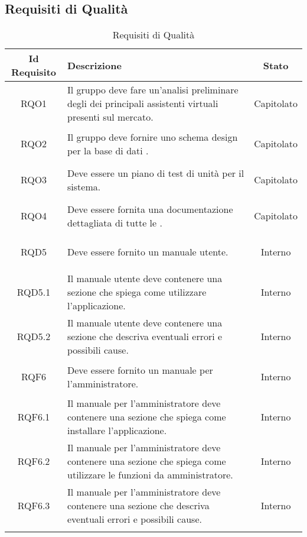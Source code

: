 \subsection{Requisiti di Qualità}
\normalsize
\begin{longtable}{|c|>{\centering}m{7cm}|c|}
	\hline
	\textbf{Id Requisito} & \textbf{Descrizione} & \textbf{Stato}\\
	\hline
	\endhead\hypertarget{RQO1}{RQO1} & Il gruppo deve fare un'analisi preliminare degli \gl{SDK} dei principali assistenti virtuali presenti sul mercato. & Capitolato\\ \hline
	\hypertarget{RQO2}{RQO2} & Il gruppo deve fornire uno schema design per la base di dati \gl{NoSQL}.
	& Capitolato\\ \hline
	\hypertarget{RQO3}{RQO3} & Deve essere \gl{prodotto} un piano di test di unità per il sistema. & Capitolato\\ \hline
	\hypertarget{RQO4}{RQO4} & Deve essere fornita una documentazione dettagliata di tutte le \gl{API}. & Capitolato\\ \hline
	\hypertarget{RQD5}{RQD5} & Deve essere fornito un manuale utente. & Interno\\ \hline
	\hypertarget{RQD5.1}{RQD5.1} & Il manuale utente deve contenere una sezione che spiega come utilizzare l'applicazione. & Interno\\ \hline
	\hypertarget{RQD5.2}{RQD5.2} & Il manuale utente deve contenere una sezione che descriva eventuali errori e possibili cause. & Interno\\ \hline
	\hypertarget{RQF6}{RQF6} & Deve essere fornito un manuale per l'amministratore. & Interno\\ \hline
	\hypertarget{RQF6.1}{RQF6.1} & Il manuale per l'amministratore deve contenere una sezione che spiega come installare l'applicazione. & Interno\\ \hline
	\hypertarget{RQF6.2}{RQF6.2} & Il manuale per l'amministratore deve contenere una sezione che spiega come utilizzare le funzioni da amministratore. & Interno\\ \hline
	\hypertarget{RQF6.3}{RQF6.3} & Il manuale per l'amministratore deve contenere una sezione che descriva eventuali errori e possibili cause. & Interno\\ \hline
	
	\caption[Requisiti di Qualità]{Requisiti di Qualità}
	\label{tabella:req2}
\end{longtable}
\clearpage
